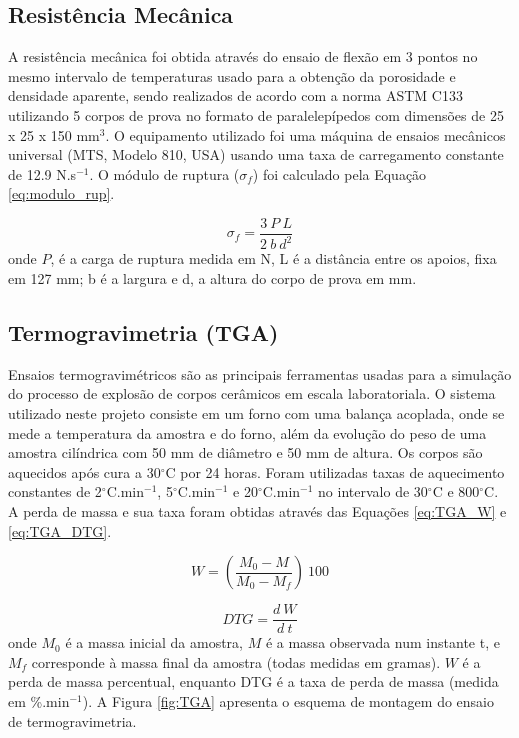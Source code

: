    

\subsection{Resistência Mecânica}\label{mat:rm}
A resistência mecânica foi obtida através do ensaio de flexão em 3 pontos no
mesmo intervalo de temperaturas usado para a obtenção da porosidade e densidade
aparente, sendo realizados de acordo com a norma ASTM C133 utilizando 5 corpos
de prova no formato de paralelepípedos com dimensões de 25 x 25 x 150 mm$^3$. O
equipamento utilizado foi uma máquina de ensaios mecânicos universal (MTS,
Modelo 810, USA) usando uma taxa de carregamento constante de 12.9 N.s$^{-1}$. O
módulo de ruptura ($\sigma_f$) foi calculado pela Equação \ref{eq:modulo_rup}.

\begin{equation}
  \label{eq:modulo_rup}
  \sigma_f = \frac{3 \ P \ L}{2 \ b \ d^2}
\end{equation}
onde $P$, é a carga de ruptura medida em N, L é a distância entre os apoios,
fixa em 127 mm; b é a largura e d, a altura do corpo de prova em mm.
    
\subsection{Termogravimetria (TGA)}\label{mat:TGA}

Ensaios termogravimétricos são as principais ferramentas usadas para a simulação
do processo de explosão de corpos cerâmicos em escala laboratoriala. O sistema
utilizado neste projeto consiste em um forno com uma balança acoplada, onde se
mede a temperatura da amostra e do forno, além da evolução do peso de uma
amostra cilíndrica com 50 mm de diâmetro e 50 mm de altura. Os corpos são
aquecidos após cura a 30$^\circ$C por 24 horas. Foram utilizadas taxas de
aquecimento constantes de 2$^\circ$C.min$^{-1}$, 5$^\circ$C.min$^{-1}$ e
20$^\circ$C.min$^{-1}$ no intervalo de 30$^\circ$C e 800$^\circ$C. A perda de
massa e sua taxa foram obtidas através das Equações \ref{eq:TGA_W} e
\ref{eq:TGA_DTG}.

\begin{equation}
  \label{eq:TGA_W}
  W = \left( \frac{M_0-M}{M_0-M_f} \right) \ 100
\end{equation}

\begin{equation}
  \label{eq:TGA_DTG}
  DTG = \frac{d \ W}{d \ t}
\end{equation}
onde $M_0$ é a massa inicial da amostra, $M$ é a massa observada num instante t,
e $M_f$ corresponde à massa final da amostra (todas medidas em gramas). $W$ é a
perda de massa percentual, enquanto DTG é a taxa de perda de massa (medida em
\%.min$^{-1}$). A Figura \ref{fig:TGA} apresenta o esquema de montagem do ensaio
de termogravimetria.
    
